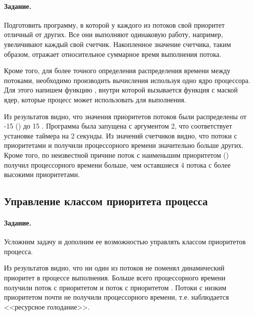 \paragraph{Задание.} Подготовить программу, в которой у каждого из потоков свой приоритет отличный от других. Все они выполняют одинаковую работу, например, увеличивают каждый свой счетчик. Накопленное значение счетчика, таким образом, отражает относительное суммарное время выполнения потока.

Кроме того, для более точного определения распределения времени между потоками, необходимо производить вычисления используя одно ядро процессора. Для этого напишем функцию , внутри которой вызывается функция  с маской ядер, которые процесс может использовать для выполнения.


Из результатов видно, что значения приоритетов потоков были распределены от -15 () до 15 . Программа была запущена с аргументом 2, что соответствует установке таймера на 2 секунды. Из значений счетчиков видно, что потоки с приоритетами  и  получили процессорного времени значительно больше других. Кроме того, по неизвестной причине поток с наименьшим приоритетом () получил процессорного времени больше, чем оставшиеся 4 потока с более высокими приоритетами.

\subsection{Управление классом приоритета процесса}

\paragraph{Задание.} Усложним задачу и дополним ее возможностью управлять классом приоритетов процесса.


Из результатов видно, что ни один из потоков не поменял динамический приоритет в процессе выполнения. Больше всего процессорного времени получили поток с приоритетом  и поток с приоритетом . Потоки с низким приоритетом почти не получили процессорного времени, т.е. наблюдается <<ресурсное голодание>>.

